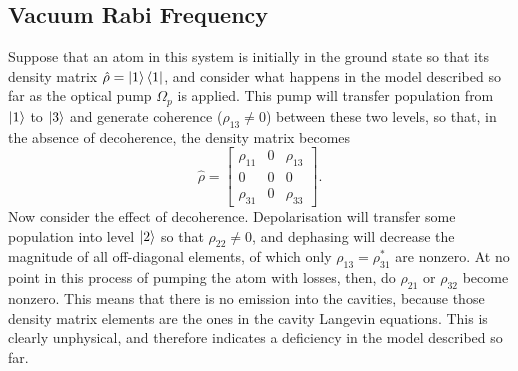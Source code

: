 \subsection{Vacuum Rabi Frequency}
Suppose that an atom in this system is initially in the ground state so that its density matrix $\hat{\rho} = \left|1\right\rangle\left\langle1\right|$, and consider what happens in the model described so far as the optical pump $\Omega_p$ is applied. This pump will transfer population from $\left|1\right\rangle$ to $\left|3\right\rangle$ and generate coherence ($\rho_{13}\neq 0$) between these two levels, so that, in the absence of decoherence, the density matrix becomes
\begin{equation}
    \hat{\rho} =
    \begin{bmatrix}
        \rho_{11} & 0 & \rho_{13}\\
        0 & 0 & 0\\
        \rho_{31} & 0 & \rho_{33}
    \end{bmatrix}.
\end{equation}
Now consider the effect of decoherence. Depolarisation will transfer some population into level $\left|2\right\rangle$ so that $\rho_{22}\neq 0$, and dephasing will decrease the magnitude of all off-diagonal elements, of which only $\rho_{13} = \rho_{31}^*$ are nonzero. At no point in this process of pumping the atom with losses, then, do $\rho_{21}$ or $\rho_{32}$ become nonzero. This means that there is no emission into the cavities, because those density matrix elements are the ones in the cavity Langevin equations. This is clearly unphysical, and therefore indicates a deficiency in the model described so far.

